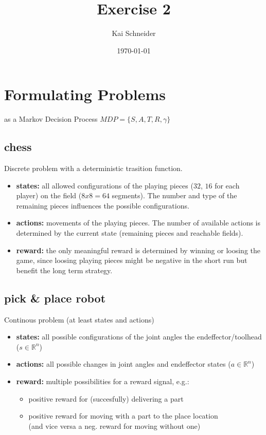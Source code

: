 \documentclass[11pt,a4paper]{article}
\title{Exercise 2}
\author{Kai Schneider}
\date{\today}
\begin{document}
 

\maketitle

\section{ Formulating Problems}

as a Markov Decision Process $MDP=\{S,A,T,R,\gamma\}$

\subsection{chess}

Discrete problem with a deterministic trasition function.

\begin{itemize}
    \item \textbf{states:} all allowed configurations of the playing pieces ($32$, $16$ for each player)
    on the field ($8x8=64$ segments). The number and type of the remaining pieces influences the possible configurations.
    \item \textbf{actions:} movements of the playing pieces. The number of available actions is determined by the current state 
    (remaining pieces and reachable fields). 
    \item \textbf{reward:} the only meaningful reward is determined by winning or loosing the game, since loosing playing pieces might be 
    negative in the short run but benefit the long term strategy. 
\end{itemize}


\subsection{pick \& place robot}

Continous problem (at least states and actions)

\begin{itemize}
    \item \textbf{states:} all possible configurations of the joint angles the endeffector/toolhead ($s \in \mathbb{R}^n$)
    \item \textbf{actions:} all possible changes in joint angles and endeffector states ($a \in \mathbb{R}^n$)
    \item \textbf{reward:} multiple possibilities for a reward signal, e.g.:
        \begin{itemize}
            \item positive reward for (succesfully) delivering a part
            \item positive reward for moving with a part to the place location \\
            (and vice versa a neg. reward for moving without one)
        \end{itemize}
\end{itemize}
\end{document}
